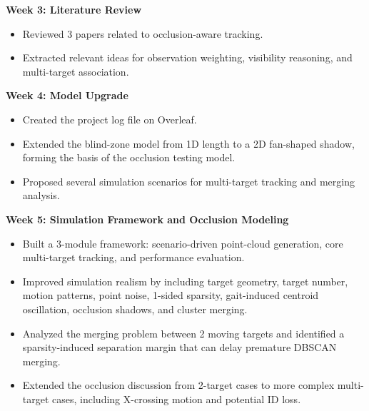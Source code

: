 \documentclass[11pt,a4paper]{report}
\newcommand{\boxitemtitle}[1]{
    \vspace{0.5em}
    {\large\textbf{\color{DeepBlue} #1}}\par
    \vspace{0.8em}
}
\begin{document}
\boxitemtitle{Week 3: Literature Review}
\begin{contentbox}
    \begin{itemize}[leftmargin=*, nosep]
        \item Reviewed 3 papers related to occlusion-aware tracking.
        \item Extracted relevant ideas for observation weighting, visibility reasoning, and multi-target association.
    \end{itemize}
\end{contentbox}

\boxitemtitle{Week 4: Model Upgrade}
\begin{contentbox}
    \begin{itemize}[leftmargin=*, nosep]
        \item Created the project log file on Overleaf.
        \item Extended the blind-zone model from 1D length to a 2D fan-shaped shadow, forming the basis of the occlusion testing model.
        \item Proposed several simulation scenarios for multi-target tracking and merging analysis.
    \end{itemize}
\end{contentbox}

\boxitemtitle{Week 5: Simulation Framework and Occlusion Modeling}
\begin{contentbox}
    \begin{itemize}[leftmargin=*, nosep]
        \item Built a 3-module framework: scenario-driven point-cloud generation, core multi-target tracking, and performance evaluation.
        \item Improved simulation realism by including target geometry, target number, motion patterns, point noise, 1-sided sparsity, gait-induced centroid oscillation, occlusion shadows, and cluster merging.
        \item Analyzed the merging problem between 2 moving targets and identified a sparsity-induced separation margin that can delay premature DBSCAN merging.
        \item Extended the occlusion discussion from 2-target cases to more complex multi-target cases, including X-crossing motion and potential ID loss.
    \end{itemize}
\end{contentbox}
\end{document}
